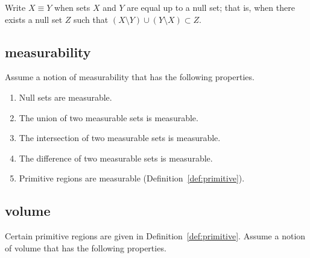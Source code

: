 Write $X\equiv Y$ when sets $X$ and $Y$ are equal up to a null set;
that is, when there exists a null set $Z$ such that
$(X\setminus Y) \cup (Y\setminus X) \subset Z$.
%
%

\subsection{measurability}\label{sec:measure}
%

Assume a notion of measurability that has the following properties.

\begin{enumerate}%
\item Null sets are measurable.
\item The union of two measurable sets is measurable.
\item The intersection of two measurable sets is measurable.
\item The difference of two measurable sets is measurable.
\item Primitive regions are measurable (Definition~\ref{def:primitive}).
%
%
\end{enumerate}

\subsection{volume}\label{sec:volume}

Certain primitive regions are given in Definition~\ref{def:primitive}.
Assume a notion of volume that has the following properties.
%

